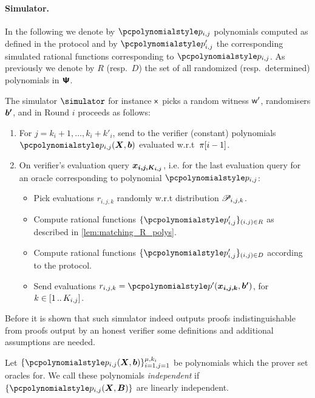 \documentclass[runningheads,11pt]{llncs}
\let\spvec\vec
\let\vec\accentvec
\let\spvec\vec
\let\vec\spvec
\def\vec#1{\mathchoice{\mbox{\boldmath$\displaystyle#1$}}
  {\mbox{\boldmath$\textstyle#1$}} {\mbox{\boldmath$\scriptstyle#1$}}
  {\mbox{\boldmath$\scriptscriptstyle#1$}}}
\begin{document}
  
  \paragraph{Simulator.}
  In the following we denote by $\p{p}_{i, j}$ polynomials
  computed as defined in the protocol and by $\p{p}'_{i, j}$ the corresponding
  simulated rational functions corresponding to $\p{p}_{i, j}$. As previously we
  denote by $R$ (resp.~$D$) the set of all randomized (resp.~determined)
  polynomials in $\bm{\mathsf{\Psi}}$.

  The simulator $\simulator$ for instance $\mathsf{x}$ picks a random witness $\mathsf{w}'$,
  randomisers $\vec{b'}$, and in Round $i$ proceeds as follows:
  \begin{enumerate}
  \item {}
    For $j = k_i + 1, \ldots, k_i + k'_i$, send to the verifier (constant) polynomials
    $\p{p}_{i, j} (\vec{X}, \vec{b})$ evaluated w.r.t~$\pi[i - 1]$.
  \item On verifier's evaluation query $\vec{x_{i, j, K_{i, j}}}$, i.e. for the last
    evaluation query for an oracle corresponding to polynomial $\p{p}_{i, j}$:
    \begin{itemize}
    \item Pick evaluations $r_{i, j, k}$ randomly w.r.t distribution
      $\mathscr{P}_{i, j, k}$.
    \item Compute rational functions $\smallset{\p{p}'_{i, j}}_{(i, j) \in R}$ as described
      in \cref{lem:matching_R_polys}. 
    \item Compute rational functions $\smallset{\p{p}'_{i, j}}_{(i, j) \in D}$
      according to the protocol.
    \item Send evaluations $r_{i, j, k} = \p{p}' (\vec{x_{i, j, k}}, \vec{b'})$, for
      $k \in [1 \, .. \, K_{i, j}]$.
    \end{itemize}
  \end{enumerate}

  Before it is shown that such simulator indeed outputs proofs indistinguishable from
  proofs output by an honest verifier some definitions and additional assumptions are needed.
    
\begin{definition}
  Let $\smallset{\p{p}_{i, j} (\vec{X}, \vec{b})}_{i = 1, j = 1}^{\mu, k_i}$ be polynomials
  which the prover set oracles for. We call these polynomials \emph{independent} if
  $\smallset{\p{p}_{i, j} (\vec{X}, \vec{B})}$ are linearly independent.
\end{definition}
\end{document}
